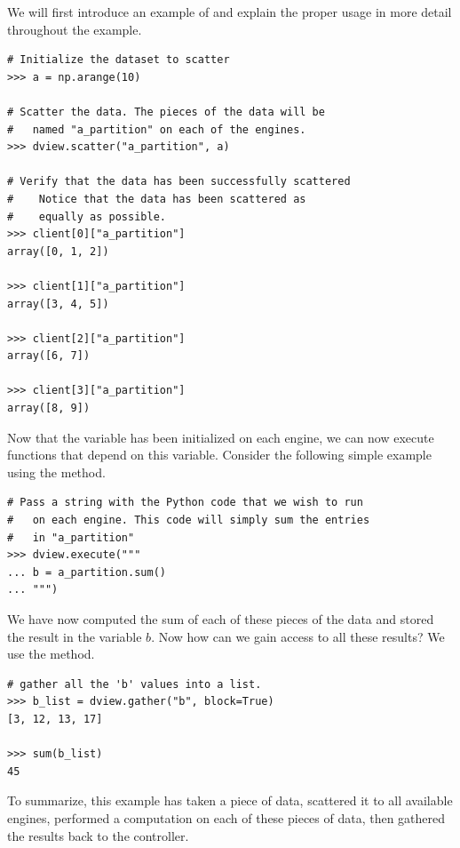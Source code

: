 We will first introduce an example of  and explain the proper usage in more detail throughout the example.

\begin{lstlisting}
# Initialize the dataset to scatter
>>> a = np.arange(10)

# Scatter the data. The pieces of the data will be
#   named "a_partition" on each of the engines.
>>> dview.scatter("a_partition", a)

# Verify that the data has been successfully scattered
#    Notice that the data has been scattered as
#    equally as possible.
>>> client[0]["a_partition"]
array([0, 1, 2])

>>> client[1]["a_partition"]
array([3, 4, 5])

>>> client[2]["a_partition"]
array([6, 7])

>>> client[3]["a_partition"]
array([8, 9])
\end{lstlisting}

Now that the  variable has been initialized on each engine, we can now execute functions that depend on this variable. Consider the following simple example using the  method.

\begin{lstlisting}
# Pass a string with the Python code that we wish to run
#   on each engine. This code will simply sum the entries
#   in "a_partition"
>>> dview.execute("""
... b = a_partition.sum()
... """)
\end{lstlisting}

We have now computed the sum of each of these pieces of the data and stored the result in the variable $b$. Now how can we gain access to all these results? We use the  method.

\begin{lstlisting}
# gather all the 'b' values into a list.
>>> b_list = dview.gather("b", block=True)
[3, 12, 13, 17]

>>> sum(b_list)
45
\end{lstlisting}

To summarize, this example has taken a piece of data, scattered it to all available engines, performed a computation on each of these pieces of data, then gathered the results back to the controller.

